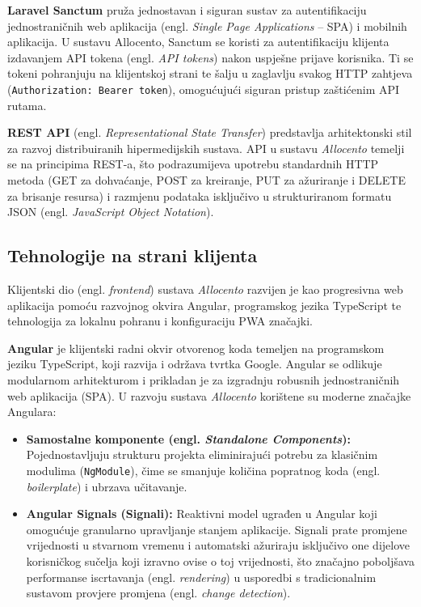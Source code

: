 \documentclass[a4paper,12pt,oneside]{article}
\begin{document}
	\textbf{Laravel Sanctum} pruža jednostavan i siguran sustav za autentifikaciju jednostraničnih web aplikacija (engl. \textit{Single Page Applications} – SPA) i mobilnih aplikacija. U sustavu Allocento, Sanctum se koristi za autentifikaciju klijenta izdavanjem API tokena (engl. \textit{API tokens}) nakon uspješne prijave korisnika. Ti se tokeni pohranjuju na klijentskoj strani te šalju u zaglavlju svakog HTTP zahtjeva (\texttt{Authorization: Bearer token}), omogućujući siguran pristup zaštićenim API rutama.
	
	\textbf{REST API} (engl. \textit{Representational State Transfer}) predstavlja arhitektonski stil za razvoj distribuiranih hipermedijskih sustava. API u sustavu \textit{Allocento} temelji se na principima REST-a, što podrazumijeva upotrebu standardnih HTTP metoda (GET za dohvaćanje, POST za kreiranje, PUT za ažuriranje i DELETE za brisanje resursa) i razmjenu podataka isključivo u strukturiranom formatu JSON (engl. \textit{JavaScript Object Notation}).
	
	\newpage

	\subsection{Tehnologije na strani klijenta}
	
	Klijentski dio (engl. \textit{frontend}) sustava \textit{Allocento} razvijen je kao progresivna web aplikacija pomoću razvojnog okvira Angular, programskog jezika TypeScript te tehnologija za lokalnu pohranu i konfiguraciju PWA značajki.
	
	\textbf{Angular} je klijentski radni okvir otvorenog koda temeljen na programskom jeziku TypeScript, koji razvija i održava tvrtka Google. Angular se odlikuje modularnom arhitekturom i prikladan je za izgradnju robusnih jednostraničnih web aplikacija (SPA). U razvoju sustava \textit{Allocento} korištene su moderne značajke Angulara:
	\begin{itemize}
		\item \textbf{Samostalne komponente (engl. \textit{Standalone Components}):} Pojednostavljuju strukturu projekta eliminirajući potrebu za klasičnim modulima (\texttt{NgModule}), čime se smanjuje količina popratnog koda (engl. \textit{boilerplate}) i ubrzava učitavanje.
		
		\item \textbf{Angular Signals (Signali):} Reaktivni model ugrađen u Angular koji omogućuje granularno upravljanje stanjem aplikacije. Signali prate promjene vrijednosti u stvarnom vremenu i automatski ažuriraju isključivo one dijelove korisničkog sučelja koji izravno ovise o toj vrijednosti, što značajno poboljšava performanse iscrtavanja (engl. \textit{rendering}) u usporedbi s tradicionalnim sustavom provjere promjena (engl. \textit{change detection}).
	\end{itemize}
	
\end{document}

